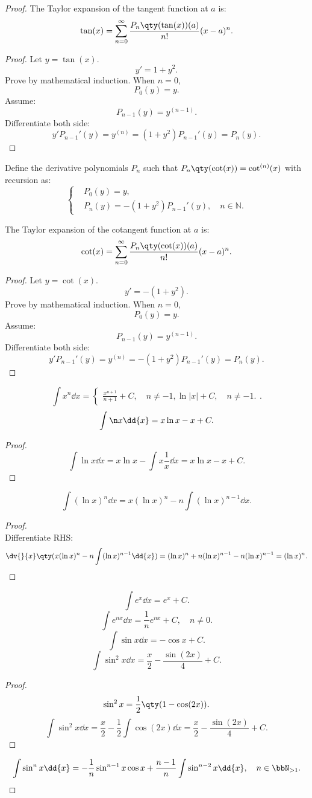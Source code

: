 \documentclass[a4paper,12pt]{report}
\begin{document}
\begin{itemize}
\begin{itemize}
\begin{proof}
The Taylor expansion of the tangent function at $a$ is:
\[\tan(x)=\sum_{n=0}^{\infty}\frac{P_n\qty(\tan(x))(a)}{n!}(x-a)^n.\]
\begin{proof}
Let $y=\tan(x)$.
\[y'=1+y^2.\]
Prove by mathematical induction. When $n=0$,
\[P_0(y)=y.\]
Assume:
\[P_{n-1}(y)=y^{(n-1)}.\]
Differentiate both side:
\[y'P_{n-1}'(y)=y^{(n)}=(1+y^2)P_{n-1}'(y)=P_n(y).\]
\end{proof}
Define the derivative polynomials $P_n$ such that $P_n\qty(\cot(x))=\cot^{(n)}(x)$ with recursion as:
\[\begin{cases}
&P_0(y)=y,\\
&P_n(y)=-(1+y^2)P_{n-1}'(y),\quad n\in\mathbb{N}.
\end{cases}\]

The Taylor expansion of the cotangent function at $a$ is:
\[\cot(x)=\sum_{n=0}^{\infty}\frac{P_n\qty(\cot(x))(a)}{n!}(x-a)^n.\]
\begin{proof}
Let $y=\cot(x)$.
\[y'=-(1+y^2).\]
Prove by mathematical induction. When $n=0$,
\[P_0(y)=y.\]
Assume:
\[P_{n-1}(y)=y^{(n-1)}.\]
Differentiate both side:
\[y'P_{n-1}'(y)=y^{(n)}=-(1+y^2)P_{n-1}'(y)=P_n(y).\]
\end{proof}
\[\int x^n\dd{x}=\begin{cases}
    \frac{x^{n+1}}{n+1}+C,\quad n\neq -1,
    \ln|x|+C,\quad n\neq -1.
\end{cases}.\]
\[\int\n x\dd{x}=x\ln x-x+C.\]
\begin{proof}
    \[\int\ln x\dd{x}=x\ln x-\int x\frac{1}{x}\dd{x}=x\ln x-x+C.\]
\end{proof}
\[\int(\ln x)^n\dd{x}=x(\ln x)^n-n\int(\ln x)^{n-1}\dd{x}.\]
\begin{proof}\mbox{}\\
    Differentiate RHS:
    \[\dv{}{x}\qty(x(\ln x)^n-n\int(\ln x)^{n-1}\dd{x})=(\ln x)^n+n(\ln x)^{n-1}-n(\ln x)^{n-1}=(\ln x)^n.\]
\end{proof}
\[\int e^x\dd{x}=e^x+C.\]
\[\int e^{nx}\dd{x}=\frac{1}{n}e^{nx}+C,\quad n\neq 0.\]
\[\int\sin x\dd{x}=-\cos x+C.\]
\[\int\sin^2 x\dd{x}=\frac{x}{2}-\frac{\sin(2x)}{4}+C.\]
\begin{proof}
    \[\sin^2 x=\frac{1}{2}\qty(1-\cos(2x)).\]
    \[\int\sin^2 x\dd{x}=\frac{x}{2}-\frac{1}{2}\int\cos(2x)\dd{x}=\frac{x}{2}-\frac{\sin(2x)}{4}+C.\]
\end{proof}
\[\int\sin^n x\dd{x}=-\frac{1}{n}\sin^{n-1}x\cos x+\frac{n-1}{n}\int\sin^{n-2}x\dd{x},\quad n\in\bbN_{>1}.\]

\end{proof}
\end{itemize}
\end{itemize}
\end{document}
